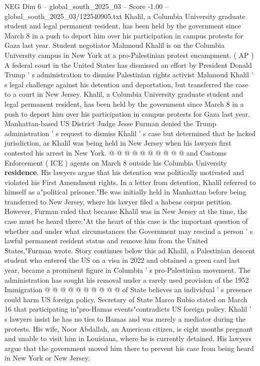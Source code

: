 \begin{textsample}{NEG Dim 6 – global\_south\_2025\_03 – Score -1.00 – global\_south\_2025\_03/122540905.txt}  \label{ex:f6_neg_140}
Khalil, a Columbia University graduate student and legal permanent resident, has been held by the government since March 8 in a push to deport him over his participation in campus protests for Gaza last year.
Student negotiator Mahmoud Khalil is on the Columbia University campus in New York at a pro-Palestinian protest encampment. ( AP ) A federal court in the United States has dismissed an effort by President Donald Trump ' s administration to dismiss Palestinian rights activist Mahmoud Khalil ' s legal challenge against his detention and deportation, but transferred the case to a court in New Jersey.
Khalil, a Columbia University graduate student and legal permanent resident, has been held by the government since March 8 in a push to deport him over his participation in campus protests for Gaza last year.
Manhattan-based US District Judge Jesse Furman denied the Trump administration ' s request to dismiss Khalil ' s case but determined that he lacked jurisdiction, as Khalil was being held in New Jersey when his lawyers first contested his arrest in New York. @ @ @ @ @ @ @ @ @ @ and Customs Enforcement ( ICE ) agents on March 8 outside his Columbia University \textbf{residence}.
His lawyers argue that his detention was politically motivated and violated his First Amendment rights.
In a letter from detention, Khalil referred to himself as a"political prisoner."He was initially held in Manhattan before being transferred to New Jersey, where his lawyer filed a habeas corpus petition.
However, Furman ruled that because Khalil was in New Jersey at the time, the case must be heard there."At the heart of this case is the important question of whether and under what circumstances the Government may rescind a person ' s lawful permanent resident status and remove him from the United States,"Furman wrote.
Story continues below this ad Khalil, a Palestinian descent student who entered the US on a visa in 2022 and obtained a green card last year, became a prominent figure in Columbia ' s pro-Palestinian movement.
The administration has sought his removal under a rarely used provision of the 1952 Immigration @ @ @ @ @ @ @ @ @ @ of State believes an individual ' s presence could harm US foreign policy.
Secretary of State Marco Rubio stated on March 16 that participating in"pro-Hamas events"contradicts US foreign policy.
Khalil ' s lawyers insist he has no ties to Hamas and was merely a mediator during the protests.
His wife, Noor Abdallah, an American citizen, is eight months pregnant and unable to visit him in Louisiana, where he is currently detained.
His lawyers argue that the government moved him there to prevent his case from being heard in New York or New Jersey.

\end{textsample}
